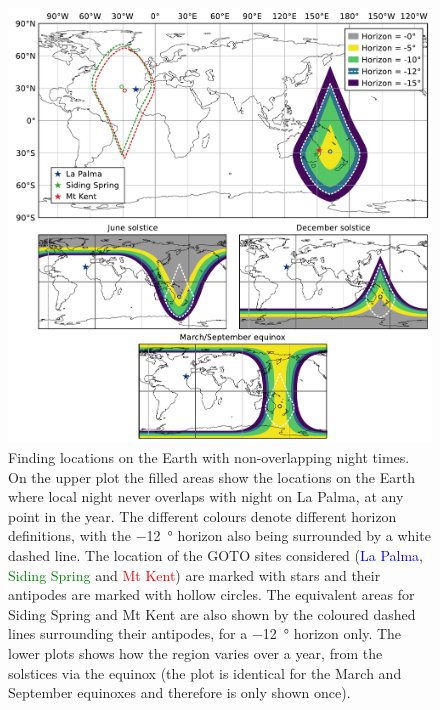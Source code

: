 \begin{colsection}
\begin{colsection}
\begin{figure}[p]
    \begin{center}
        \includegraphics[width=\linewidth]{images/sites.pdf}
    \end{center}
    \caption[Locations on the Earth with non-overlapping night times]{
        Finding locations on the Earth with non-overlapping night times. On the upper plot the filled areas show the locations on the Earth where local night never overlaps with night on La Palma, at any point in the year. The different colours denote different horizon definitions, with the \SI{-12}{\degree} horizon also being surrounded by a white dashed line. The location of the GOTO sites considered (\textcolor{Blue}{La Palma}, \textcolor{Green}{Siding Spring} and \textcolor{Red}{Mt Kent}) are marked with stars and their antipodes are marked with hollow circles. The equivalent areas for Siding Spring and Mt Kent are also shown by the coloured dashed lines surrounding their antipodes, for a \SI{-12}{\degree} horizon only. The lower plots shows how the region varies over a year, from the solstices via the equinox (the plot is identical for the March and September equinoxes and therefore is only shown once).
    }\label{fig:site_nights}
\end{figure}

\clearpage


\end{colsection}
\end{colsection}

